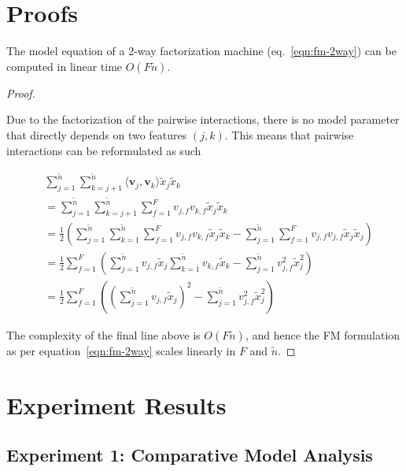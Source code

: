 \documentclass{mldsmsc}
\begin{document}
\section{Proofs}

\begin{lemma}
    \label{lemma:fm-linearity}
    The model equation of a 2-way factorization machine (eq.~\ref{eqn:fm-2way}) can
    be computed in linear time $O(F\tilde{n})$.
    \end{lemma}
    
    \begin{proof}
    \label{prf:fm-linearity}
    
    Due to the factorization of the pairwise interactions, there is no model
    parameter that directly depends on two features $(j,k)$. This means that
    pairwise interactions can be reformulated as such
    
    \begin{align*}
        &\sum_{j=1}^{\tilde{n}} \sum_{k=j+1}^{\tilde{n}} \langle \mathbf{v}_j , \mathbf{v}_k \rangle \tilde{x}_j \tilde{x}_k \\
        &= \sum_{j=1}^{\tilde{n}} \sum_{k=j+1}^{\tilde{n}} 
        \sum_{f=1}^{F}v_{j,f} v_{k,f}\tilde{x}_j \tilde{x}_k \\
        &= \frac{1}{2} \left( \sum_{j=1}^{\tilde{n}} \sum_{k=1}^{\tilde{n}}
        \sum_{f=1}^{F} v_{j,f} v_{k,f} \tilde{x}_j \tilde{x}_k -
        \sum_{j=1}^{\tilde{n}} \sum_{f=1}^{F}v_{j,f} v_{j,f} \tilde{x}_j \tilde{x}_j \right)\\
        &=\frac{1}{2}\sum_{f=1}^{F} \left( \sum_{j=1}^{\tilde{n}}v_{j,f} \tilde{x}_j
        \sum_{k=1}^{\tilde{n}} v_{k,f} \tilde{x}_k - \sum_{j=1}^{\tilde{n}}
        v_{j,f}^2 \tilde{x}_j^2 \right)\\
        &= \frac{1}{2}\sum_{f=1}^{F} \left( \left(\sum_{j=1}^{\tilde{n}}v_{j,f} \tilde{x}_j\right)^2
        - \sum_{j=1}^{\tilde{n}} v_{j,f}^2 \tilde{x}_j^2 \right)
    \end{align*}
    
    The complexity of the final line above is $O(F\tilde{n})$, and hence the FM formulation
    as per equation~\ref{eqn:fm-2way} scales linearly in $F$ and $\tilde{n}$.
    \end{proof}

\section{Experiment Results}

\subsection{Experiment 1: Comparative Model Analysis}
\end{document}
